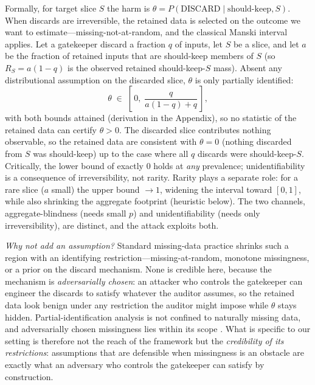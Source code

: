 \documentclass[conference]{IEEEtran}
\begin{document}
\medskip
\noindent Formally, for target slice $S$ the harm is
$\theta = P(\text{DISCARD}\mid\text{should-keep}, S)$. When discards are irreversible, the retained data is
selected on the outcome we want to estimate---missing-not-at-random, and the classical Manski interval
\cite{manski2003} applies. Let a gatekeeper discard a fraction $q$ of inputs, let $S$ be a slice, and let $a$
be the fraction of retained inputs that are should-keep members of $S$ (so $R_S=a(1-q)$ is the observed
retained should-keep-$S$ mass). Absent any distributional assumption on the discarded slice, $\theta$ is only
partially identified:
\begin{equation}\label{eq:manski}
\theta \;\in\; \left[\,0,\; \frac{q}{a(1-q)+q}\,\right],
\end{equation}
with both bounds attained (derivation in the Appendix), so no statistic of the retained data can certify
$\theta > 0$. The
discarded slice contributes nothing observable, so the retained data are consistent with $\theta = 0$
(nothing discarded from $S$ was should-keep) up to the case where all $q$ discards were should-keep-$S$.
Critically, the lower bound of exactly $0$ holds at \emph{any} prevalence; unidentifiability is a consequence
of irreversibility, not rarity. Rarity plays a separate role: for a rare slice ($a$ small) the upper bound
$\to 1$, widening the interval toward $[0,1]$, while also shrinking the aggregate footprint (heuristic below). The two
channels, aggregate-blindness (needs small $p$) and unidentifiability (needs only irreversibility), are
distinct, and the attack exploits both.

\noindent\emph{Why not add an assumption?} Standard missing-data practice shrinks such a region with an
identifying restriction---missing-at-random, monotone missingness, or a prior on the discard mechanism. None is
credible here, because the mechanism is \emph{adversarially chosen}: an attacker who controls the gatekeeper can
engineer the discards to satisfy whatever the auditor assumes, so the retained data look benign under any
restriction the auditor might impose while $\theta$ stays hidden. Partial-identification analysis is not
confined to naturally missing data, and adversarially chosen missingness lies within its scope
\cite{manski2003}. What is specific to our setting is therefore not the reach of the framework but the
\emph{credibility of its restrictions}: assumptions that are defensible when missingness is an obstacle are
exactly what an adversary who controls the gatekeeper can satisfy by construction.
\end{document}
